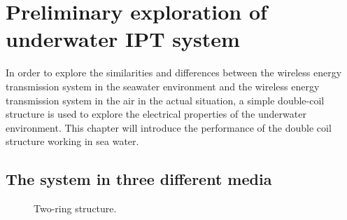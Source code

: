 \chapter{Preliminary exploration of underwater IPT system}

In order to explore the similarities and differences between the wireless energy transmission system in the seawater environment and the wireless energy transmission system in the air in the actual situation, a simple double-coil structure is used to explore the electrical properties of the underwater environment. This chapter will introduce the performance of the double coil structure working in sea water.




\section{The system in three different media}

\begin{figure}[!b]
    \caption{Two-ring structure.}
    \label{fig:3_two_ring_coil}
\end{figure}

